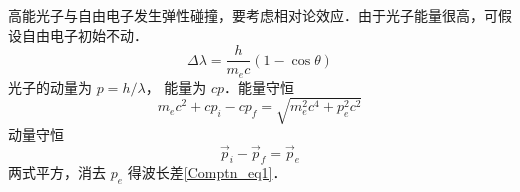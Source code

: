 高能光子与自由电子发生弹性碰撞，要考虑相对论效应．由于光子能量很高，可假设自由电子初始不动．
\begin{equation}\label{Comptn_eq1}
\Delta \lambda  = \frac{h}{m_e c}(1 - \cos \theta )
\end{equation}
光子的动量为 $p = h/\lambda$， 能量为 $cp$．能量守恒
\begin{equation}
{m_e}{c^2} + c{p_i} - c{p_f} = \sqrt {m_e^2{c^4} + p_e^2{c^2}}
\end{equation}
动量守恒
\begin{equation}
{\vec p_i} - {\vec p_f} = {\vec p_e}
\end{equation}
两式平方，消去 $p_e$ 得波长差\autoref{Comptn_eq1}．
